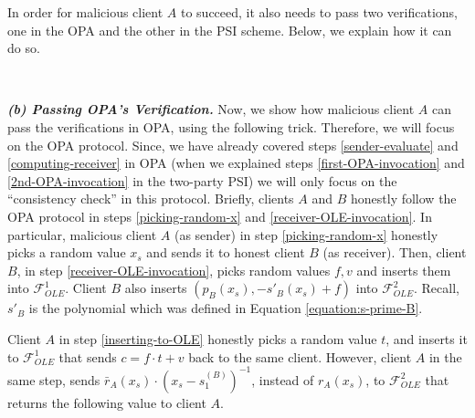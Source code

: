 In order for  malicious client $A$ to succeed, it also needs to pass two verifications, one in the OPA and the other in the PSI scheme. Below, we explain how it can do so. 
  
  
  

 \
  
 \noindent\textit{\textbf{(b) Passing OPA's Verification.}} Now, we show how  malicious client $A$ can   pass the verifications in OPA, using the following trick. Therefore, we will focus on the OPA protocol. Since,  we have already covered steps \ref{sender-evaluate} and \ref{computing-receiver} in OPA (when we explained steps \ref{first-OPA-invocation} and \ref{2nd-OPA-invocation} in the two-party PSI)   we will only focus on the ``consistency check'' in this protocol. Briefly, clients $A$ and $B$ honestly follow the OPA protocol in steps \ref{picking-random-x}  and  \ref{receiver-OLE-invocation}. In particular, malicious client $A$ (as sender) in step \ref{picking-random-x} honestly picks a random value $x_{\scriptscriptstyle s}$ and sends it to honest client $B$ (as receiver). Then, client $B$, in step \ref{receiver-OLE-invocation}, picks random values $f,v$ and inserts them into  $\mathcal{F}_{\scriptscriptstyle OLE}^{\scriptscriptstyle 1}$. Client $B$ also inserts $(p_{\scriptscriptstyle B}(x_{\scriptscriptstyle s}), -s'_{\scriptscriptstyle B}(x_{\scriptscriptstyle s})+f)$ into  $\mathcal{F}_{\scriptscriptstyle OLE}^{\scriptscriptstyle 2}$. Recall, $s'_{\scriptscriptstyle B}$ is the polynomial which was defined  in Equation \ref{equation:s-prime-B}. 
  
  
  
  
 
Client $A$ in step \ref{inserting-to-OLE} honestly picks a random value $t$, and inserts it to $\mathcal{F}_{\scriptscriptstyle OLE}^{\scriptscriptstyle 1}$ that sends $c=f\cdot t+v$  back to  the same client. However, client $A$ in the same step,  sends $\bar{r}_{\scriptscriptstyle A}(x_{\scriptscriptstyle s})\cdot (x_{\scriptscriptstyle s}-s^{\scriptscriptstyle(B)}_{\scriptscriptstyle 1})^{\scriptscriptstyle -1}$, instead of $r_{\scriptscriptstyle A}(x_{\scriptscriptstyle s})$,  to $\mathcal{F}_{\scriptscriptstyle OLE}^{\scriptscriptstyle 2}$ that returns the following value to client $A$.


